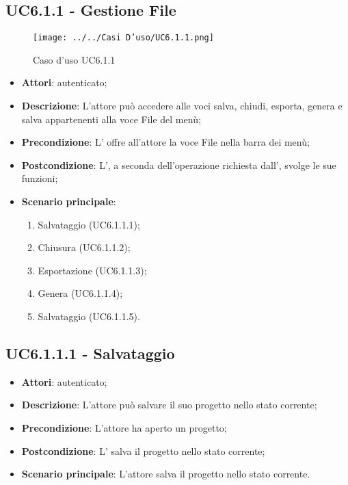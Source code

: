 \subsection{UC6.1.1 - Gestione File}
\label{ssec:UC6.1.1}
\begin{figure}[h!]
\centering
\texttt{[image: ../../Casi D'uso/UC6.1.1.png]}
\caption{Caso d'uso UC6.1.1}
 \end{figure}
\begin{itemize}
\item \textbf{Attori}:  autenticato;
\item \textbf{Descrizione}: L’attore può accedere alle voci salva, chiudi, esporta, genera  e salva  appartenenti alla voce File del menù;
\item \textbf{Precondizione}: L’ offre all’attore la voce File nella barra dei menù;
\item \textbf{Postcondizione}: L’, a seconda dell’operazione richiesta dall’,
svolge le sue funzioni;
\item \textbf{Scenario principale}: \begin{enumerate}\item Salvataggio (UC6.1.1.1);\item Chiusura (UC6.1.1.2);\item Esportazione (UC6.1.1.3);\item Genera  (UC6.1.1.4);\item Salvataggio  (UC6.1.1.5).
 \end{enumerate}
\end{itemize}
\newpage
\subsection{UC6.1.1.1 - Salvataggio}
\label{ssec:UC6.1.1.1}
\begin{itemize}
\item \textbf{Attori}:  autenticato;
\item \textbf{Descrizione}: L’attore può salvare il suo progetto nello stato corrente;
\item \textbf{Precondizione}: L’attore ha aperto un progetto;
\item \textbf{Postcondizione}: L’ salva il progetto nello stato corrente;
\item \textbf{Scenario principale}: L'attore salva il progetto nello stato corrente.
\end{itemize}
